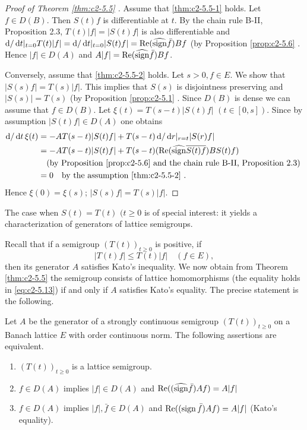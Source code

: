 \begin{proof}[Proof of Theorem \ref{thm:c2-5.5}  ]
Assume that \ref{thm:c2-5.5-1}   holds. 
Let $f \in D(B)$. 
Then $S(t)f$ is differentiable at $t$. 
By the chain rule B-II, Proposition 2.3,
$T(t)|f| = |S(t)f|$ is also differentiable and $\mathop{}\!\mathrm{d}{}/\mathop{}\!\mathrm{d}{t}|_{t=0} T(t)|f| = \mathop{}\!\mathrm{d}{}/\mathop{}\!\mathrm{d}{t}|_{t=0} |S(t)f| = \mathop{}\!\mathrm{Re}(\widehat{\operatorname{sign}}  \bar{f})Bf$ (by  Proposition \ref{prop:c2-5.6} .
Hence $|f| \in D(A)$ and $A|f| = \mathop{}\!\mathrm{Re}(\widehat{\operatorname{sign}}  \bar{f})Bf$.

Conversely, assume that \ref{thm:c2-5.5-2}   holds. 
Let $s > 0, f \in E$. 
We show that $|S(s)f| = T(s)|f|$. 
This implies that $S(s)$ is disjointness preserving and $|S(s)| = T(s)$ (by Proposition \ref{prop:c2-5.1}  . 
Since $D(B)$ is dense we can assume that $f \in D(B)$. 
Let $\xi(t) = T(s-t)|S(t)f|$ $(t \in [0,s])$.
Since by assumption $|S(t)f| \in D(A)$ one obtains
\begin{align*}
\mathop{}\!\mathrm{d}{}/\mathop{}\!\mathrm{d}{t} \, \xi(t) &= -AT(s-t)|S(t)f| + T(s-t)\mathop{}\!\mathrm{d}{}/\mathop{}\!\mathrm{d}{r}|_{r=t} |S(r)f|\\
&= -AT(s-t)|S(t)f| + T(s-t)(\mathop{}\!\mathrm{Re}(\widehat{\operatorname{sign}}  \overline{S(t)f})BS(t)f)\\
&\quad \text{(by  Proposition \ref{prop:c2-5.6}   and the chain rule B-II, Proposition 2.3)
}\\
&= 0 \quad \text{by the assumption \ref{thm:c2-5.5-2}  }.
\end{align*}
Hence $\xi(0) = \xi(s)$; \ie $|S(s)f| = T(s)|f|$.
\end{proof}
The case when $S(t) = T(t)$ $(t \geq 0$ is of special interest: it yields a characterization of generators of lattice semigroups.

Recall that if a semigroup $(T(t))_{t \geq 0}$ is positive, \ie if
\begin{equation}\label{eq:c2-5.13}
|T(t)f| \leq T(t) |f| \quad (f \in E) ,
\end{equation}
then its generator $A$ satisfies Kato's inequality. 
We now obtain from Theorem \ref{thm:c2-5.5} the semigroup consists of lattice homomorphisms (\ie the equality holds in \eqref{eq:c2-5.13}) if and only if $A$ satisfies Kato's equality. 
The precise statement is the following.

\begin{corollary}\label{cor:c2-5.8}
Let $A$ be the generator of a strongly continuous semigroup $(T(t))_{t \geq 0}$ on a Banach lattice $E$ with order continuous norm. 
The following assertions are equivalent.
\begin{enumerate}[\upshape (a)]
\item \label{cor:c2-5.8-1}
$(T(t))_{t \geq 0}$ is a lattice semigroup.
\item \label{cor:c2-5.8-2}
$f \in D(A)$ implies $|f| \in D(A)$ and $\mathop{}\!\mathrm{Re}((\widehat{\operatorname{sign}}  \bar{f})Af) = A|f|$ 
\item \label{cor:c2-5.8-3}
$f \in D(A)$ implies $|f|,\bar{f} \in D(A)$ and $\mathop{}\!\mathrm{Re}((\operatorname{sign}  \bar{f})Af) = A|f|$ 
(Kato's equality).
\end{enumerate}
\end{corollary}

